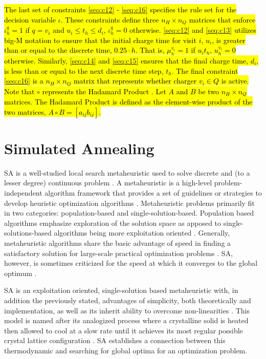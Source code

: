 \documentclass[11pt,a4paper,final]{article}
\newcommand{\Qset}{Q}                       %
\begin{document}
\hl{The last set of constraints {\ref{seq:c12}} - {\ref{seq:c16}} specifies the rule set for the decision variable
  $\iota$. These constraints define three $n_H \times n_Q$ matrices that enforce $\iota_h^q = 1$ if $q = v_i$ and $u_i
  \le t_h \le d_i$, $\iota_h^q = 0$ otherwise. {\ref{seq:c12}} and {\ref{seq:c13}} utilizes big-M notation to ensure
  that the initial charge time for visit $i$, $u_i$, is greater than or equal to the discrete time, $0.25 \cdot h$. That
  is, $\mu_h^{v_i} = 1$ if $u_i t_h$, $u_h^{v_i} = 0$ otherwise. Similarly, {\ref{seq:c14}} and {\ref{seq:c15}} ensures
  that the final charge time, $d_i$, is less than or equal to the next discrete time step, $t_h$. The final constraint
  {\ref{seq:c16}} is a $n_H \times n_Q$ matrix that represents whether charger $v_i \in \Qset$ is active. Note that
  $\circ$ represents the Hadamard Product \cite{horn-1985-matrix-analy}. Let $A$ and $B$ be two $n_H \times n_Q$
  matrices. The Hadamard Product is defined as the element-wise product of the two matrices, $A \circ B =
  [a_{ij}b_{ij}]$.}
\section{Simulated Annealing}
\label{sec:simulated-annealing}
SA is a well-studied local search metaheuristic used to solve discrete and (to a lesser degree) continuous problem
\cite{gendreau-2018-handb-metah}. A metaheuristic is a high-level problem-independent algorithm framework that provides
a set of guidelines or strategies to develop heuristic optimization algorithms \cite{radosavljevic-2018-metah-optim}.
Metaheuristic problems primarily fit in two categories: population-based and single-solution-based. Population based
algorithms emphasize exploration of the solution space as apposed to single-solutions-based algorithms being more
exploitation oriented \cite{radosavljevic-2018-metah-optim}. Generally, metaheuristic algorithms share the basic
advantage of speed in finding a satisfactory solution for large-scale practical optimization problems
\cite{radosavljevic-2018-metah-optim}. SA, however, is sometimes criticized for the speed at which it converges to the
global optimum \cite{gendreau-2018-handb-metah,henderson-1989-theor-pract}.

SA is an exploitation oriented, single-solution based metaheuristic with, in addition the previously stated, advantages
of simplicity, both theoretically and implementation, as well as its inherit ability to overcome non-linearities
\cite{gendreau-2018-handb-metah,radosavljevic-2018-metah-optim}. This model is named after its analogized process
where a crystalline solid is heated then allowed to cool at a slow rate until it achieves its most regular possible
crystal lattice configuration \cite{henderson-1989-theor-pract}. SA establishes a connection between this thermodynamic
and searching for global optima for an optimization problem.
\end{document}
